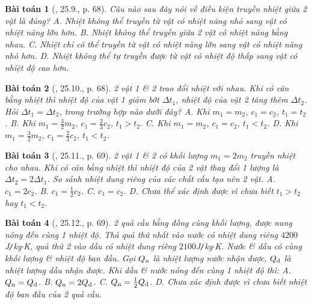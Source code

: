 \documentclass{article}
\newtheorem{baitoan}{Bài toán}
\begin{document}
\begin{baitoan}[\cite{SBT_Vat_Ly_8}, 25.9., p. 68]
	Câu nào sau đây nói về điều kiện truyền nhiệt giữa 2 vật là đúng? {\sf A.} Nhiệt không thể truyền từ vật có nhiệt năng nhỏ sang vật có nhiệt năng lớn hơn. {\sf B.} Nhiệt không thể truyền giữa 2 vật có nhiệt năng bằng nhau. {\sf C.} Nhiệt chỉ có thể truyền từ vật có nhiệt năng lớn sang vật có nhiệt năng nhỏ hơn. {\sf D.} Nhiệt không thể tự truyền được từ vật có nhiệt độ thấp sang vật có nhiệt độ cao hơn.
\end{baitoan}

\begin{baitoan}[\cite{SBT_Vat_Ly_8}, 25.10., p. 68]
	2 vật 1 \& 2 trao đổi nhiệt với nhau. Khi có cân bằng nhiệt thì nhiệt độ của vật 1 giảm bớt $\Delta t_1$, nhiệt độ của vật 2 tăng thêm $\Delta t_2$. Hỏi $\Delta t_1 = \Delta t_2$, trong trường hợp nào dưới đây? {\sf A.} Khi $m_1 = m_2$, $c_1 = c_2$, $t_1 = t_2$. {\sf B.} Khi $m_1  = \frac{3}{2}m_2$, $c_1 = \frac{2}{3}c_2$, $t_1 > t_2.$ {\sf C.} Khi $m_1 = m_2$, $c_1 = c_2$, $t_1 < t_2$. {\sf D.} Khi $m_1 = \frac{3}{2}m_2$, $c_1 = \frac{2}{3}c_2$, $t_1 < t_2$.
\end{baitoan}

\begin{baitoan}[\cite{SBT_Vat_Ly_8}, 25.11., p. 69]
	2 vật 1 \& 2 có khối lượng $m_1 = 2m_2$ truyền nhiệt cho nhau. Khi có cân bằng nhiệt thì nhiệt độ của 2 vật thay đổi 1 lượng là $\Delta t_2 = 2\Delta t_1$. So sánh nhiệt dung riêng của các chất cấu tạo nên 2 vật. {\sf A.} $c_1 = 2c_2$. {\sf B.} $c_1 = \frac{1}{2}c_2$. {\sf C.} $c_1 = c_2$. {\sf D.} Chưa thể xác định được vì chưa biết $t_1 > t_2$ hay $t_1 < t_2$.
\end{baitoan}

\begin{baitoan}[\cite{SBT_Vat_Ly_8}, 25.12., p. 69]
	2 quả cầu bằng đồng cùng khối lượng, được nung nóng đến cùng 1 nhiệt độ. Thả quả thứ nhất vào nước có nhiệt dung riêng $4200$\emph{J\texttt{/}kg$\cdot$K}, quả thứ 2 vào dầu có nhiệt dung riêng $2100$\emph{J\texttt{/}kg$\cdot$K}. Nước \& dầu có cùng khối lượng \& nhiệt độ ban đầu. Gọi $Q_{\rm n}$ là nhiệt lượng nước nhận được, $Q_{\rm d}$ là nhiệt lượng dầu nhận được. Khi dầu \& nước nóng đến cùng 1 nhiệt độ thì: {\sf A.} $Q_{\rm n} = Q_{\rm d}$. {\sf B.} $Q_{\rm n} = 2Q_{\rm d}$. {\sf C.} $Q_{\rm n} = \frac{1}{2}Q_{\rm d}$. {\sf D.} Chưa xác định được vì chưa biết nhiệt độ ban đầu của 2 quả cầu.
\end{baitoan}
\end{document}

